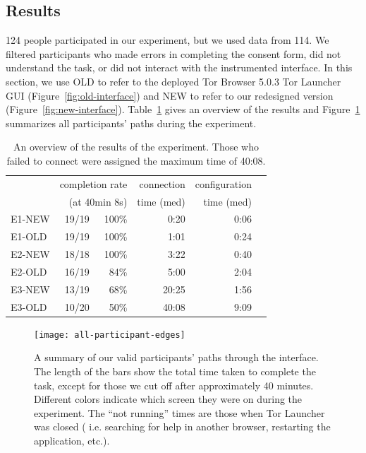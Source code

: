 \documentclass[USenglish,oneside,twocolumn]{article}
\begin{document}
\subsection{Results} 
124 people participated in our experiment, but we used data from 114. We filtered participants who made errors in completing the consent form, did not understand the task, or did not interact with the instrumented interface. In this section, we use OLD to refer to the deployed Tor Browser 5.0.3 Tor Launcher GUI (Figure~\ref{fig:old-interface}) and NEW to refer to our redesigned version (Figure~\ref{fig:new-interface}). Table~\ref{table:participant-summary} gives an overview of the results and Figure~\ref{fig:all-participant-edges} summarizes all participants' paths during the experiment.

\begin{table}[t]
\centering
\begin{tabular}{l r r r r r}
& \multicolumn{2}{r}{completion rate} & \multicolumn{1}{r}{connection} & \multicolumn{1}{r}{configuration} \\
& \multicolumn{2}{r}{(at 40min 8s)} & \multicolumn{1}{r}{time (med)} & \multicolumn{1}{r}{time (med)} \\
\noalign{\hrule}
E1-NEW & 19/19 & 100\% & 0:20 & 0:06 \\
E1-OLD & 19/19 & 100\% & 1:01 & 0:24 \\
E2-NEW & 18/18 & 100\% & 3:22 & 0:40 \\
E2-OLD & 16/19 & 84\% & 5:00 & 2:04 \\
E3-NEW & 13/19 & 68\% & 20:25 & 1:56 \\
E3-OLD & 10/20 & 50\% & 40:08 & 9:09 \\
\end{tabular}
\caption{
An overview of the results of the experiment. Those who
failed to connect were assigned the maximum time of 40:08.
}
\label{table:participant-summary}
\end{table}

\label{all-participant-edges} 
\begin{figure}
\centering
\texttt{[image: all-participant-edges]}
\caption{
A summary of our valid participants' paths through the interface.
The length of the bars show the total time taken to complete the task,
except for those we cut off after approximately 40 minutes.
Different colors indicate which screen they were on during the experiment.
The ``not running'' times are those when Tor Launcher was closed (
i.e. searching for help in another browser, restarting the application, etc.).
}
\label{fig:all-participant-edges}
\end{figure}
\end{document}
